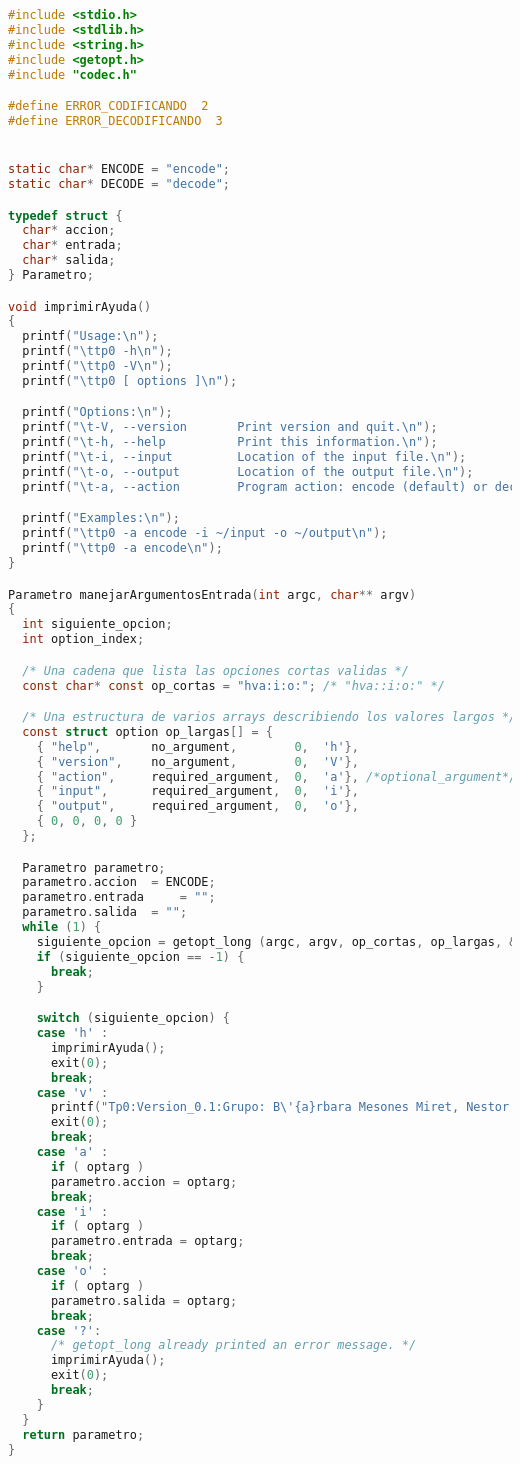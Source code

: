 \documentclass[a4paper,11pt, margin=1in]{article}
\begin{document}
\begin{lstlisting}[language=C,breaklines=true]
#include <stdio.h>
#include <stdlib.h>
#include <string.h>
#include <getopt.h>
#include "codec.h"

#define ERROR_CODIFICANDO  2
#define ERROR_DECODIFICANDO  3


static char* ENCODE = "encode";
static char* DECODE = "decode";

typedef struct {
  char* accion;
  char* entrada;
  char* salida;
} Parametro;

void imprimirAyuda()
{
  printf("Usage:\n");
  printf("\ttp0 -h\n");
  printf("\ttp0 -V\n");
  printf("\ttp0 [ options ]\n");

  printf("Options:\n");
  printf("\t-V, --version       Print version and quit.\n");
  printf("\t-h, --help          Print this information.\n");
  printf("\t-i, --input         Location of the input file.\n");
  printf("\t-o, --output        Location of the output file.\n");
  printf("\t-a, --action        Program action: encode (default) or decode.\n");

  printf("Examples:\n");
  printf("\ttp0 -a encode -i ~/input -o ~/output\n");
  printf("\ttp0 -a encode\n");
}

Parametro manejarArgumentosEntrada(int argc, char** argv)
{
  int siguiente_opcion;
  int option_index;

  /* Una cadena que lista las opciones cortas validas */
  const char* const op_cortas = "hva:i:o:"; /* "hva::i:o:" */

  /* Una estructura de varios arrays describiendo los valores largos */
  const struct option op_largas[] = {
    { "help",    	no_argument,  		0,  'h'},
    { "version",    no_argument,  		0,  'V'},
    { "action",    	required_argument,  0,  'a'}, /*optional_argument*/
    { "input",     	required_argument,  0,  'i'},
    { "output",    	required_argument,  0,  'o'},
    { 0, 0, 0, 0 }
  };

  Parametro parametro;
  parametro.accion 	= ENCODE;
  parametro.entrada 	= "";
  parametro.salida 	= "";
  while (1) {
    siguiente_opcion = getopt_long (argc, argv, op_cortas, op_largas, &option_index);
    if (siguiente_opcion == -1) {
      break;
    }

    switch (siguiente_opcion) {
    case 'h' :
      imprimirAyuda();
      exit(0);
      break;
    case 'v' :
      printf("Tp0:Version_0.1:Grupo: B\'{a}rbara Mesones Miret, Nestor Huallpa, Sebasti\'{a}n D'Alessandro Szymanowski\n");
      exit(0);
      break;
    case 'a' :
      if ( optarg )
      parametro.accion = optarg;
      break;
    case 'i' :
      if ( optarg )
      parametro.entrada = optarg;
      break;
    case 'o' :
      if ( optarg )
      parametro.salida = optarg;
      break;
    case '?':
      /* getopt_long already printed an error message. */
      imprimirAyuda();
      exit(0);
      break;
    }
  }
  return parametro;
}


\end{lstlisting}
\end{document}

